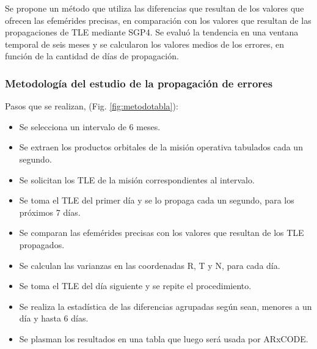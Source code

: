 Se propone un m\'etodo que utiliza las diferencias que resultan de los valores que ofrecen las efem\'erides precisas, en comparaci\'on con los valores que resultan de las propagaciones de TLE mediante SGP4. Se evalu\'o la tendencia en una ventana temporal de seis meses y se calcularon los valores medios de los errores, en funci\'on de la cantidad de d\'ias de propagaci\'on.

\subsubsection*{Metodolog\'ia del estudio de la propagaci\'on de errores}\label{subsec:errorProp}
Pasos que se realizan, (Fig. \ref{fig:metodotabla}):
\begin{itemize}
\itemsep0em
\item Se selecciona un intervalo de 6 meses.
\item Se extraen los productos orbitales de la misi\'on operativa tabulados cada un segundo.
\item Se solicitan los TLE de la misi\'on correspondientes al intervalo.
\item Se toma el TLE del primer d\'ia y se lo propaga cada un segundo, para los pr\'oximos 7 d\'ias.
\item Se comparan las efem\'erides precisas con los valores que resultan de los TLE propagados.
\item Se calculan las varianzas en las coordenadas R, T y N, para cada d\'ia.
\item Se toma el TLE del d\'ia siguiente y se repite el procedimiento.
\item Se realiza la estad\'istica  de las diferencias agrupadas seg\'un sean, menores a un d\'ia y hasta 6 d\'ias.
\item Se plasman los resultados en una tabla que luego ser\'a usada por ARxCODE.
\end{itemize}

